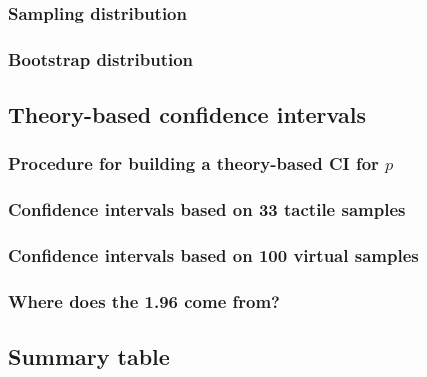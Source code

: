 \documentclass[12pt, krantz2,]{krantz}
\begin{document}
\hypertarget{sampling-distribution}{%
\subsubsection*{Sampling distribution}\label{sampling-distribution}}


\hypertarget{bootstrap-distribution-1}{%
\subsubsection*{Bootstrap distribution}\label{bootstrap-distribution-1}}


\hypertarget{theory-ci}{%
\subsection{Theory-based confidence intervals}\label{theory-ci}}

\hypertarget{procedure-for-building-a-theory-based-ci-for-p}{%
\subsubsection*{\texorpdfstring{Procedure for building a theory-based CI for \(p\)}{Procedure for building a theory-based CI for p}}\label{procedure-for-building-a-theory-based-ci-for-p}}


\hypertarget{confidence-intervals-based-on-33-tactile-samples}{%
\subsubsection*{Confidence intervals based on 33 tactile samples}\label{confidence-intervals-based-on-33-tactile-samples}}


\hypertarget{confidence-intervals-based-on-100-virtual-samples}{%
\subsubsection*{Confidence intervals based on 100 virtual samples}\label{confidence-intervals-based-on-100-virtual-samples}}


\hypertarget{where-does-the-1.96-come-from}{%
\subsubsection*{Where does the 1.96 come from?}\label{where-does-the-1.96-come-from}}


\hypertarget{ci-conclusion-table}{%
\subsection{Summary table}\label{ci-conclusion-table}}
\end{document}
